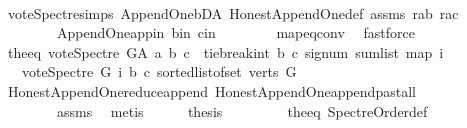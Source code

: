 \begin{isabellebody}
\ \ \ \ \ \ \isamarkupfalse%
\ vote{\isacharunderscore}{\kern0pt}Spectre{\isachardot}{\kern0pt}simps\ Append{\isacharunderscore}{\kern0pt}One{\isachardot}{\kern0pt}bD{\isacharunderscore}{\kern0pt}A\ Honest{\isacharunderscore}{\kern0pt}Append{\isacharunderscore}{\kern0pt}One{\isacharunderscore}{\kern0pt}def\ assms\ r{\isacharunderscore}{\kern0pt}ab\ r{\isacharunderscore}{\kern0pt}ac\ \isanewline
\ \ \ \ \ \ \ \ Append{\isacharunderscore}{\kern0pt}One{\isachardot}{\kern0pt}app{\isacharunderscore}{\kern0pt}in\ b{\isacharunderscore}{\kern0pt}in\ c{\isacharunderscore}{\kern0pt}in\isanewline
\ \ \ \ \ \ \ \ map{\isacharunderscore}{\kern0pt}eq{\isacharunderscore}{\kern0pt}conv\ \isamarkupfalse%
\ fastforce\ \isanewline
\ \ \ \ \isamarkupfalse%
\ \isamarkupfalse%
\ the{\isacharunderscore}{\kern0pt}eq{\isacharcolon}{\kern0pt}\ {\isachardoublequoteopen}vote{\isacharunderscore}{\kern0pt}Spectre\ G{\isacharunderscore}{\kern0pt}A\ a\ b\ c\ {\isacharequal}{\kern0pt}\ {\isacharparenleft}{\kern0pt}tie{\isacharunderscore}{\kern0pt}break{\isacharunderscore}{\kern0pt}int\ b\ c\ {\isacharparenleft}{\kern0pt}signum\ {\isacharparenleft}{\kern0pt}sum{\isacharunderscore}{\kern0pt}list\ {\isacharparenleft}{\kern0pt}map\ {\isacharparenleft}{\kern0pt}{\isasymlambda}i{\isachardot}{\kern0pt}\isanewline
\ \ \ {\isacharparenleft}{\kern0pt}vote{\isacharunderscore}{\kern0pt}Spectre\ G\ i\ b\ c{\isacharparenright}{\kern0pt}{\isacharparenright}{\kern0pt}\ {\isacharparenleft}{\kern0pt}sorted{\isacharunderscore}{\kern0pt}list{\isacharunderscore}{\kern0pt}of{\isacharunderscore}{\kern0pt}set\ {\isacharparenleft}{\kern0pt}verts\ G{\isacharparenright}{\kern0pt}{\isacharparenright}{\kern0pt}{\isacharparenright}{\kern0pt}{\isacharparenright}{\kern0pt}{\isacharparenright}{\kern0pt}{\isacharparenright}{\kern0pt}{\isachardoublequoteclose}\isanewline
\ \ \ \ \ \ \isamarkupfalse%
\ Honest{\isacharunderscore}{\kern0pt}Append{\isacharunderscore}{\kern0pt}One{\isachardot}{\kern0pt}reduce{\isacharunderscore}{\kern0pt}append\ Honest{\isacharunderscore}{\kern0pt}Append{\isacharunderscore}{\kern0pt}One{\isachardot}{\kern0pt}append{\isacharunderscore}{\kern0pt}past{\isacharunderscore}{\kern0pt}all\ \isanewline
\ \ \ \ \ \ \ \ assms{\isacharparenleft}{\kern0pt}{}{\isacharparenright}{\kern0pt}\ \isamarkupfalse%
\ metis\isanewline
\ \ \ \ \isamarkupfalse%
\ {\isacharquery}{\kern0pt}thesis\ \isanewline
\ \ \ \ \ \ \isamarkupfalse%
\ the{\isacharunderscore}{\kern0pt}eq\ Spectre{\isacharunderscore}{\kern0pt}Order{\isacharunderscore}{\kern0pt}def\ \isamarkupfalse%

\end{isabellebody}
